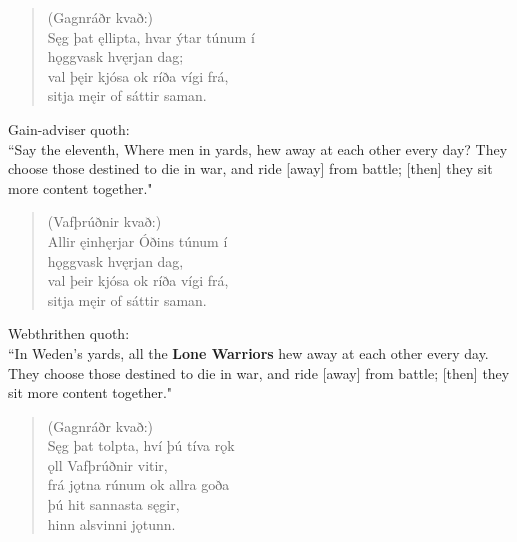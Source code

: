 \begin{verse}
(Gagnráðr kvað:) \\%
\bva Sęg þat ęllipta, \hld hvar ýtar túnum í \\%
\ind hǫggvask hvęrjan dag; \\%
val þęir kjósa \hld ok ríða vígi frá, \\%
\ind sitja męir of sáttir saman.\footnotemark[35]\\%
\end{verse}

\bvb Gain-adviser quoth: \\ “Say the eleventh, Where men in yards, hew away at each other every day? They choose those destined to die in war, and ride [away] from battle; [then] they sit more content together." \\

\begin{verse}
(Vafþrúðnir kvað:) \\%
\bva Allir ęinhęrjar \hld Óðins túnum í \\%
\ind hǫggvask hvęrjan dag, \\%
val þeir kjósa \hld ok ríða vígi frá, \\%
\ind sitja męir of sáttir saman.\\%
\end{verse}

\bvb Webthrithen quoth: \\ “In Weden's yards, all the \textbf{Lone Warriors} hew away at each other every day. They choose those destined to die in war, and ride [away] from battle; [then] they sit more content together." \\

\begin{verse}
(Gagnráðr kvað:) \\%
\bva Sęg þat tolpta, \hld hví þú tíva rǫk \\%
\ind ǫll Vafþrúðnir vitir, \\%
frá jǫtna rúnum \hld ok allra goða \\%
\ind þú hit sannasta sęgir, \\%
\ind hinn alsvinni jǫtunn.\\%
\end{verse}

